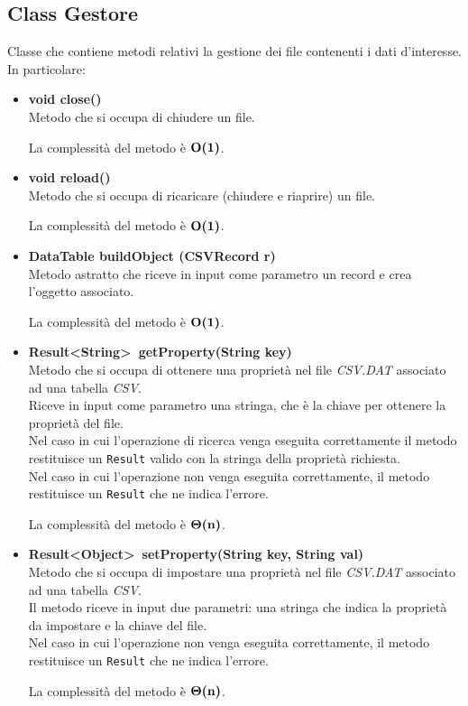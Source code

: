 \documentclass[a4paper, 12pt]{scrreprt}
\begin{document}
			\subsection{Class Gestore}
			Classe che contiene metodi relativi la gestione dei file contenenti i dati d'interesse. In particolare:
			\begin{itemize}
				\item \textbf{void close()}
				\\Metodo che si occupa di chiudere un file.

				La complessit\`a del metodo \`e $\mathbf{O}\textbf{(1)}$.

				\item \textbf{void reload()}
				\\Metodo che si occupa di ricaricare (chiudere e riaprire) un file.

				La complessit\`a del metodo \`e $\mathbf{O}\textbf{(1)}$.

				\item \textbf {DataTable buildObject (CSVRecord r)}
				\\Metodo astratto che riceve in input come parametro un record e crea l'oggetto associato.

				La complessit\`a del metodo \`e $\mathbf{O}\textbf{(1)}$.
\pagebreak
				\item \textbf{Result\textless String\textgreater~getProperty(String key)}
				\\Metodo che si occupa di ottenere una propriet\`a nel file\textsl{ CSV.DAT} associato ad una tabella \textsl{CSV}.
				\\Riceve in input come parametro una stringa, che \`e la chiave per ottenere la propriet\`a del file.
				\\Nel caso in cui l'operazione di ricerca venga eseguita correttamente il metodo restituisce un \verb!Result! valido con la stringa della propriet\`a richiesta.
				\\Nel caso in cui l'operazione non venga eseguita correttamente, il metodo restituisce un \verb!Result! che ne indica l'errore.

				La complessit\`a del metodo \`e $\mathbf{\Theta}\textbf{(n)}$.

				\item \textbf{Result\textless Object\textgreater~setProperty(String key, String val)}
				\\Metodo che si occupa di impostare una propriet\`a nel file \textsl{CSV.DAT} associato ad una tabella \textsl{CSV}.
				\\Il metodo riceve in input due parametri: una stringa che indica la propriet\`a da impostare e la chiave del file.
				\\Nel caso in cui l'operazione non venga eseguita correttamente, il metodo restituisce un \verb!Result! che ne indica l'errore.

				La complessit\`a del metodo \`e $\mathbf{\Theta}\textbf{(n)}$.

			\end{itemize}
\end{document}
